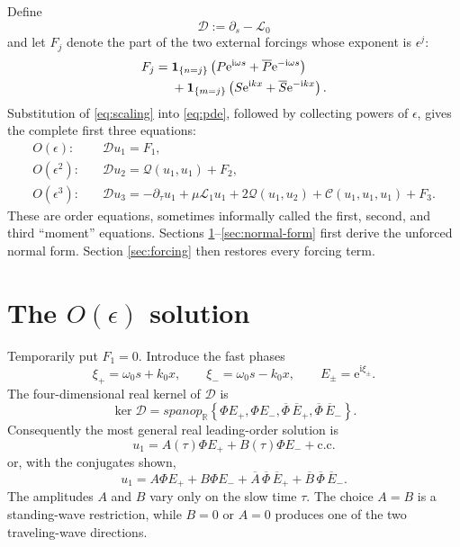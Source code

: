 \documentclass[11pt]{article}
\newcommand{\ii}{\mathrm{i}}
\newcommand{\ee}{\mathrm{e}}
\newcommand{\cQ}{\mathcal{Q}}
\newcommand{\cC}{\mathcal{C}}
\newcommand{\cL}{\mathcal{L}}
\newcommand{\cD}{\mathcal{D}}
\newcommand{\cc}{\text{c.c.}}
\begin{document}
Define
\begin{equation}
  \cD:=\partial_s-\cL_0
  \label{eq:D-definition}
\end{equation}
and let $F_j$ denote the part of the two external forcings whose exponent is
$\epsilon^j$:
\begin{align}
  F_j={}&\bm{1}_{\{n=j\}}
  \left(P\ee^{\ii\omega s}+\overline P\ee^{-\ii\omega s}\right)\notag\\
  &+\bm{1}_{\{m=j\}}
  \left(S\ee^{\ii kx}+\overline S\ee^{-\ii kx}\right).
  \label{eq:Fj}
\end{align}
Substitution of \eqref{eq:scaling} into \eqref{eq:pde}, followed by collecting
powers of $\epsilon$, gives the complete first three equations:
\begin{subequations}
\label{eq:moment-equations}
\begin{align}
  O(\epsilon):\quad
  &\cD u_1=F_1,
  \label{eq:o1}\\
  O(\epsilon^2):\quad
  &\cD u_2=\cQ(u_1,u_1)+F_2,
  \label{eq:o2}\\
  O(\epsilon^3):\quad
  &\cD u_3=-\partial_\tau u_1+\mu\cL_1u_1
  +2\cQ(u_1,u_2)+\cC(u_1,u_1,u_1)+F_3.
  \label{eq:o3}
\end{align}
\end{subequations}
These are order equations, sometimes informally called the first, second, and
third ``moment'' equations.  Sections \ref{sec:u1}--\ref{sec:normal-form}
first derive the unforced normal form.  Section \ref{sec:forcing} then restores
every forcing term.

\section{The \texorpdfstring{$O(\epsilon)$}{O(epsilon)} solution}
\label{sec:u1}

Temporarily put $F_1=0$.  Introduce the fast phases
\begin{equation}
  \xi_+=\omega_0s+k_0x,
  \qquad
  \xi_-=\omega_0s-k_0x,
  \qquad
  E_\pm=\ee^{\ii\xi_\pm}.
  \label{eq:phases}
\end{equation}
The four-dimensional real kernel of $\cD$ is
\begin{equation}
  \ker\cD=spanop_{\mathbb{R}}
  \left\{\Phi E_+,\Phi E_-,\overline\Phi\,\overline E_+,
  \overline\Phi\,\overline E_-\right\}.
\end{equation}
Consequently the most general real leading-order solution is
\begin{equation}
  u_1=A(\tau)\Phi E_+ +B(\tau)\Phi E_-+\cc
  \label{eq:u1}
\end{equation}
or, with the conjugates shown,
\begin{equation}
  u_1=A\Phi E_+ +B\Phi E_-
  +\overline A\,\overline\Phi\,\overline E_+
  +\overline B\,\overline\Phi\,\overline E_-.
  \label{eq:u1-full}
\end{equation}
The amplitudes $A$ and $B$ vary only on the slow time $\tau$.  The choice
$A=B$ is a standing-wave restriction, while $B=0$ or $A=0$ produces one of
the two traveling-wave directions.
\end{document}
